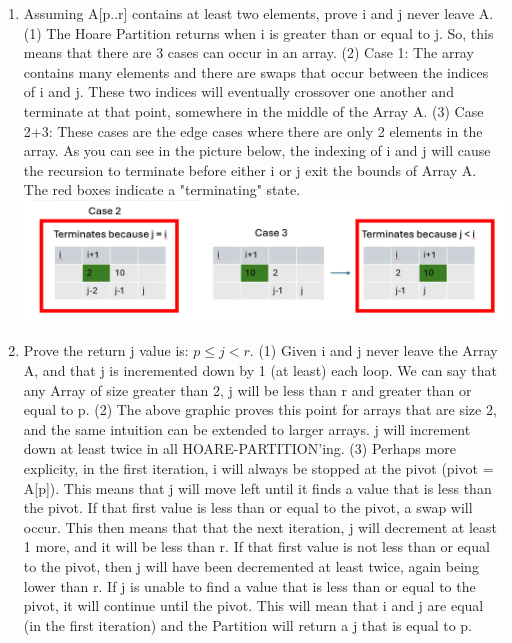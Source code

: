 \documentclass{article}
\begin{document}
\begin{enumerate}[label=(\alph*)]
    \item Assuming A[p..r] contains at least two elements, prove i and j never leave A.
    \subitem (1) The Hoare Partition returns when i is greater than or equal to j. So, this means that there are 3 cases can occur in an array.
    \subitem (2) Case 1: The array contains many elements and there are swaps that occur between the indices of i and j. These two indices will eventually crossover one another and terminate at that point, somewhere in the middle of the Array A.
    \subitem (3) Case 2+3: These cases are the edge cases where there are only 2 elements in the array. As you can see in the picture below, the indexing of i and j will cause the recursion to terminate before either i or j exit the bounds of Array A. The red boxes indicate a "terminating" state.
    \subitem \includegraphics[width=1\textwidth]{cases.png}
    
    \item Prove the return j value is: $p\leq j < r$. 
    \subitem (1) Given i and j never leave the Array A, and that j is incremented down by 1 (at least) each loop. We can say that any Array of size greater than 2, j will be less than r and greater than or equal to p. 
    \subitem (2) The above graphic proves this point for arrays that are size 2, and the same intuition can be extended to larger arrays. j will increment down at least twice in all HOARE-PARTITION'ing. 
    \subitem (3) Perhaps more explicity, in the first iteration, i will always be stopped at the pivot (pivot = A[p]). This means that j will move left until it finds a value that is less than the pivot. If that first value is less than or equal to the pivot, a swap will occur. This then means that that the next iteration, j will decrement at least 1 more, and it will be less than r. If that first value is not less than or equal to the pivot, then j will have been decremented at least twice, again being lower than r. If j is unable to find a value that is less than or equal to the pivot, it will continue until the pivot. This will mean that i and j are equal (in the first iteration) and the Partition will return a j that is equal to p.
\end{enumerate}
\end{document}

